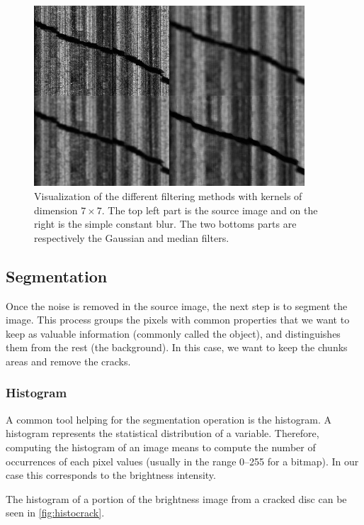 \begin{figure}[!ht]
\centering
\includegraphics[width=0.9\textwidth]{images/filter-methods}
\caption[Visualization of the different filtering methods]
{Visualization of the different filtering methods with kernels of dimension $7 \times 7$. The top left part is the source image and on the right is the simple constant blur. The two bottoms parts are respectively the Gaussian and median filters.}
\label{fig:filtermeth}
\end{figure}

\subsection{Segmentation}
\label{sec:chunksegm}

Once the noise is removed in the source image, the next step is to segment the image. This process groups the pixels with common properties that we want to keep as valuable information (commonly called the object), and distinguishes them from the rest (the background). In this case, we want to keep the chunks areas and remove the cracks.

\subsubsection{Histogram}

A common tool helping for the segmentation operation is the histogram. A histogram represents the statistical distribution of a variable. Therefore, computing the histogram of an image means to compute the number of occurrences of each pixel values (usually in the range \numrange[range-phrase=--]{0}{255} for a bitmap). In our case this corresponds to the brightness intensity.

The histogram of a portion of the brightness image from a cracked disc can be seen in \autoref{fig:histocrack}.

